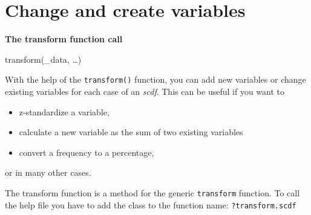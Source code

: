 \documentclass[
  letterpaper,
  DIV=11,
  numbers=noendperiod]{scrreprt}
\providecommand{\tightlist}{%
  \setlength{\itemsep}{0pt}\setlength{\parskip}{0pt}}\usepackage{longtable,booktabs,array}
\begin{document}
\hypertarget{change-and-create-variables}{%
\section{Change and create
variables}\label{change-and-create-variables}}

\begin{tcolorbox}[enhanced jigsaw, breakable, rightrule=.15mm, bottomrule=.15mm, arc=.35mm, colback=white, colframe=quarto-callout-tip-color-frame, opacityback=0, leftrule=.75mm, toprule=.15mm, left=2mm]
\begin{minipage}[t]{5.5mm}
\textcolor{quarto-callout-tip-color}{\faLightbulb}
\end{minipage}%
\begin{minipage}[t]{\textwidth - 5.5mm}

\textbf{The transform function call}\vspace{2mm}

transform(\_data, \ldots)

\end{minipage}%
\end{tcolorbox}

With the help of the \texttt{transform()} function, you can add new
variables or change existing variables for each case of an \emph{scdf}.
This can be useful if you want to

\begin{itemize}
\tightlist
\item
  z-standardize a variable,
\item
  calculate a new variable as the sum of two existing variables
\item
  convert a frequency to a percentage,
\end{itemize}

or in many other cases.

\begin{tcolorbox}[enhanced jigsaw, breakable, toptitle=1mm, colframe=quarto-callout-note-color-frame, arc=.35mm, titlerule=0mm, coltitle=black, rightrule=.15mm, bottomtitle=1mm, bottomrule=.15mm, colbacktitle=quarto-callout-note-color!10!white, title=\textcolor{quarto-callout-note-color}{\faInfo}\hspace{0.5em}{Note}, colback=white, opacitybacktitle=0.6, opacityback=0, leftrule=.75mm, toprule=.15mm, left=2mm]

The transform function is a method for the generic \texttt{transform}
function. To call the help file you have to add the class to the
function name: \texttt{?transform.scdf}

\end{tcolorbox}
\end{document}
